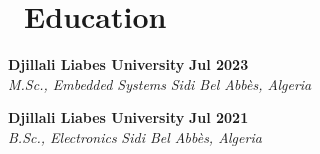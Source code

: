 \documentclass[11pt,a4paper]{article}
\begin{document}
\section*{\faGraduationCap\ Education}
\textbf{Djillali Liabes University} \hfill \textbf{Jul 2023} \\
\textit{M.Sc., Embedded Systems} 
\hfill \textit{Sidi Bel Abbès, Algeria}

\textbf{Djillali Liabes University} \hfill \textbf{Jul 2021} \\
\textit{B.Sc., Electronics} 
\hfill \textit{Sidi Bel Abbès, Algeria} 
\end{document}
